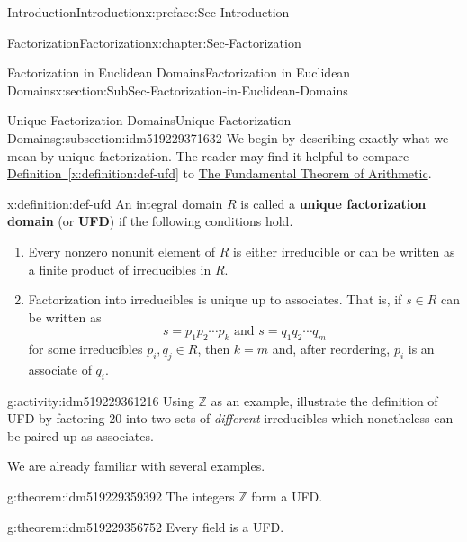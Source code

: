 \documentclass[oneside,10pt,]{book}
\newcommand{\xreffont}{\relax}
\newcommand{\terminology}[1]{\textbf{#1}}
\numberwithin{equation}{section}
\def\Z{{\mathbb Z}}
\begin{document}
\begin{preface}{Introduction}{}{Introduction}{}{}{x:preface:Sec-Introduction}
\begin{chapterptx}{Factorization}{}{Factorization}{}{}{x:chapter:Sec-Factorization}
\begin{sectionptx}{Factorization in Euclidean Domains}{}{Factorization in Euclidean Domains}{}{}{x:section:SubSec-Factorization-in-Euclidean-Domains}
\begin{introduction}{}
\end{introduction}%
%
%
\typeout{************************************************}
\typeout{************************************************}
%
\begin{subsectionptx}{Unique Factorization Domains}{}{Unique Factorization Domains}{}{}{g:subsection:idm519229371632}
We begin by describing exactly what we mean by unique factorization. The reader may find it helpful to compare \hyperref[x:definition:def-ufd]{Definition~{\xreffont\ref{x:definition:def-ufd}}} to \hyperref[x:assemblage:ftarith]{The Fundamental Theorem of Arithmetic}.%
\begin{definition}{}{x:definition:def-ufd}%
%
An integral domain \(R\) is called a \terminology{unique factorization domain} (or \terminology{UFD}) if the following conditions hold.%
\begin{enumerate}
\item{}Every nonzero nonunit element of \(R\) is either irreducible or can be written as a finite product of irreducibles in \(R\).%
\item{}Factorization into irreducibles is unique up to associates. That is, if \(s\in R\) can be written as%
\begin{equation*}
s = p_1 p_2 \cdots p_k \text{ and }  s = q_1 q_2 \cdots q_m
\end{equation*}
for some irreducibles \(p_i, q_j\in R\), then \(k=m\) and, after reordering, \(p_i\) is an associate of \(q_i\).%
\end{enumerate}
%
\end{definition}
\begin{activity}{}{g:activity:idm519229361216}%
Using \(\Z\) as an example, illustrate the definition of UFD by factoring 20 into two sets of \emph{different} irreducibles which nonetheless can be paired up as associates.%
\end{activity}
We are already familiar with several examples.%
\begin{theorem}{}{}{g:theorem:idm519229359392}%
The integers \(\Z\) form a UFD.%
\end{theorem}
\begin{theorem}{}{}{g:theorem:idm519229356752}%
Every field is a UFD.%
\end{theorem}
\end{subsectionptx}
%
%
\typeout{************************************************}

\end{sectionptx}
\end{chapterptx}
\end{preface}
\end{document}
